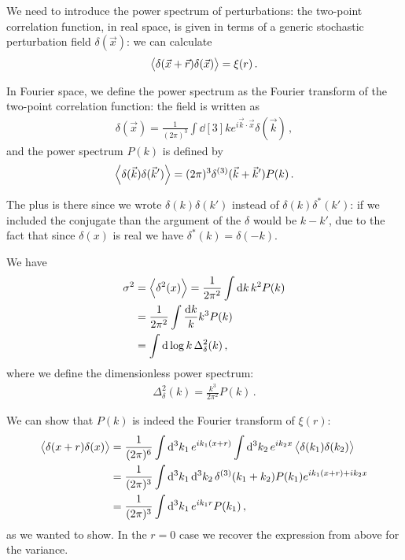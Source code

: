 \documentclass[main.tex]{subfiles}
\begin{document}
We need to introduce the power spectrum of perturbations: 
the two-point correlation function, in real space, is given in terms of a generic stochastic perturbation field \(\delta (\vec{x})\): we can calculate 
%
\begin{align}
\expval{ \delta (\vec{x} + \vec{r}) \delta (\vec{x})} = \xi (r)
\,.
\end{align}

In Fourier space, we define the power spectrum as the Fourier transform of the two-point correlation function: the field is written as 
%
\begin{align}
\delta (\vec{x}) = \frac{1}{(2\pi )^3} \int \dd[3]{k} e^{i \vec{k} \cdot \vec{x}} \delta (\vec{k})
\,,
\end{align}
%
and the power spectrum \(P(k)\) is defined by
%
\begin{align}
\expval{ \delta (\vec{k}) \delta (\vec{k}')} = (2\pi )^3 \delta^{(3)} (\vec{k} + \vec{k}') P(k)
\,.
\end{align}

The plus is there since we wrote \(\delta (k) \delta (k')\) instead of \(\delta(k) \delta^{*}(k')\): if we included the conjugate than the argument of the \(\delta \) would be \(k - k'\), due to the fact that since \(\delta (x)\) is real we have \(\delta^{*}(k) = \delta (-k)\). 

We have 
%
\begin{align}
\sigma^2 &= \expval{ \delta^2(x)}
= \frac{1}{2 \pi^2} \int \dd{k} k^2 P(k)  \\
&= \frac{1}{2 \pi^2} \int \frac{ \dd{k}}{k} k^3 P(k)  \\
&= \int \dd{\log k } \Delta^2_\delta  (k)
\,,
\end{align}
%
where we define the dimensionless power spectrum: 
%
\begin{align}
\Delta^2_\delta (k) = \frac{k^3}{2 \pi^2} P(k)
\,.
\end{align}

We can show that \(P(k)\) is indeed the Fourier transform of \(\xi (r)\): 
%
\begin{align}
\expval{ \delta (x+r) \delta (x)} &= \frac{1}{(2 \pi )^6}
\int \dd[3]{k_1 } e^{i k_1 (x+r)} \int \dd[3]{k_2 } e^{i k_2 x} 
\expval{\delta (k_1 ) \delta (k_2 )}  \\
&= \frac{1}{(2 \pi )^3} \int \dd[3]{k_1 } \dd[3]{k_2 } \delta^{(3)} (k_1 + k_2 ) P(k_1 ) e^{i k_1 (x+r) + i k_2 x}  \\
&= \frac{1}{(2 \pi )^3} \int \dd[3]{k_1 } e^{i k_1 r} P(k_1 )
\,,
\end{align}
%
as we wanted to show. 
In the \(r = 0\) case we recover the expression from above for the variance. 
\end{document}
